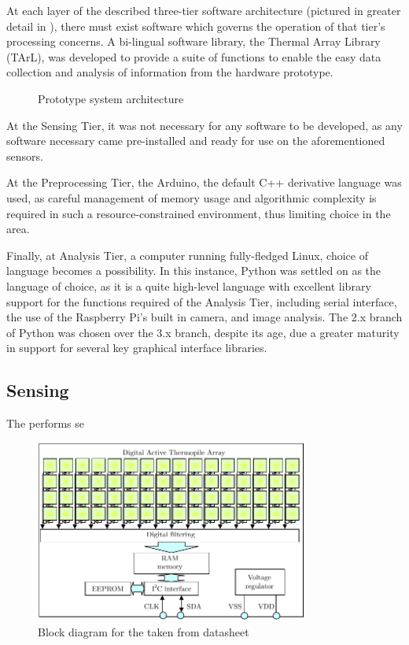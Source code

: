 \documentclass[../thesis/thesis.tex]{subfiles}
\begin{document}
At each layer of the described three-tier software architecture (pictured in greater detail in ), there must exist software which governs the operation of that tier's processing concerns. A bi-lingual software library, the Thermal Array Library (TArL), was developed to provide a suite of functions to enable the easy data collection and analysis of information from the hardware prototype.

\begin{figure}
\centering

\caption{Prototype system architecture}
\label{fig:pictures:protob-arch}
\end{figure}

At the Sensing Tier, it was not necessary for any software to be developed, as any software necessary came pre-installed and ready for use on the aforementioned sensors.

At the Preprocessing Tier, the Arduino, the default C++ derivative language was used, as careful management of memory usage and algorithmic complexity is required in such a resource-constrained environment, thus limiting choice in the area.

Finally, at Analysis Tier, a computer running fully-fledged Linux, choice of language becomes a possibility. In this instance, Python was settled on as the language of choice, as it is a quite high-level language with excellent library support for the functions required of the Analysis Tier, including serial interface, the use of the Raspberry Pi's built in camera, and image analysis. The 2.x branch of Python was chosen over the 3.x branch, despite its age, due a greater maturity in support for several key graphical interface libraries.

\subsection{Sensing}
The \mlx performs se

\begin{figure}
\centering
\includegraphics[width=0.8\textwidth]{../diagrams/mlx-block-diagram.pdf}
\caption{Block diagram for the \mlx taken from datasheet \cite{MLXDatasheet}}
\label{fig:exps:blockdia}
\end{figure}
\end{document}

